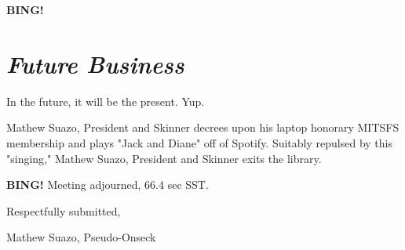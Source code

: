 \documentclass[10pt]{article}
\newcommand{\bing}{{\bf BING!} }
\newcommand{\goto}[1]{\bing \vskip 12pt \section*{{\em{#1}}}}
\newcommand{\skinner}{Mathew Suazo, President and Skinner }
\newcommand{\onseck}{Mathew Suazo, Pseudo-Onseck}
\begin{document}
\goto{Future Business}

In the future, it will be the present. Yup.

\skinner decrees upon his laptop honorary MITSFS membership and plays "Jack and Diane" off of Spotify. Suitably repulsed by this "singing," \skinner exits the library.

\bing
\noindent
Meeting adjourned, 66.4 sec SST.

\vspace{18pt}

\centerline{Respectfully submitted,}
\centerline{\onseck}
\end{document}
